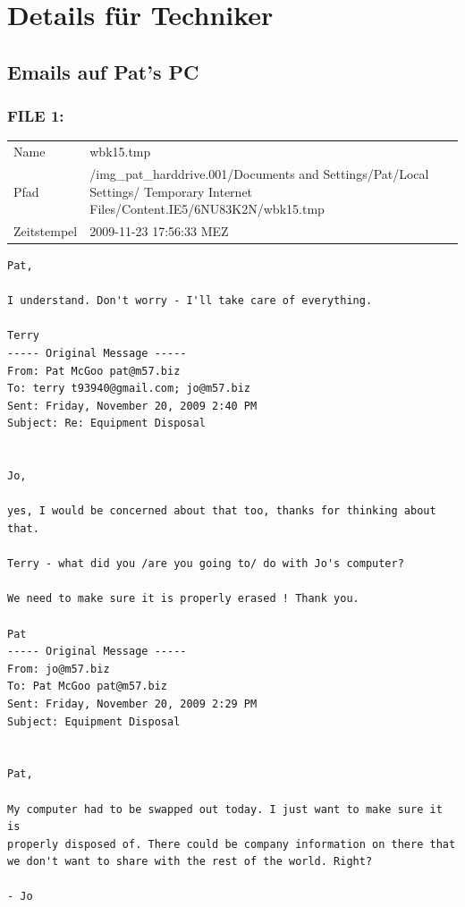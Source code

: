 \chapter{Details für Techniker}
\label{sec:details_tec}



\section{Emails auf Pat's PC}
\label{sec:pat_emails}

\subsection{FILE 1:}
\label{sec:pat_emails_1}

\begin{table}[htb]
	\begin{tabular}{p{2cm} p{13.5cm}}
		Name & wbk15.tmp\\
		Pfad & /img_pat_harddrive.001/Documents and Settings/Pat/Local Settings/ Temporary Internet Files/Content.IE5/6NU83K2N/wbk15.tmp\\
		Zeitstempel & 2009-11-23 17:56:33 MEZ
	\end{tabular}
\end{table}	

\begin{lstlisting}
Pat,

I understand. Don't worry - I'll take care of everything.

Terry
----- Original Message ----- 
From: Pat McGoo pat@m57.biz
To: terry t93940@gmail.com; jo@m57.biz
Sent: Friday, November 20, 2009 2:40 PM
Subject: Re: Equipment Disposal


Jo,

yes, I would be concerned about that too, thanks for thinking about 
that.

Terry - what did you /are you going to/ do with Jo's computer?

We need to make sure it is properly erased ! Thank you.

Pat
----- Original Message ----- 
From: jo@m57.biz
To: Pat McGoo pat@m57.biz
Sent: Friday, November 20, 2009 2:29 PM
Subject: Equipment Disposal


Pat,

My computer had to be swapped out today. I just want to make sure it is
properly disposed of. There could be company information on there that 
we don't want to share with the rest of the world. Right?

- Jo
\end{lstlisting}

